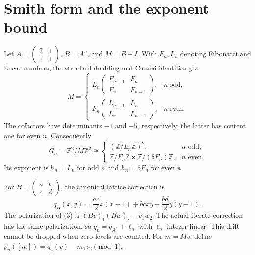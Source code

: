 \documentclass[10pt]{article}
\begin{document}
\section{Smith form and the exponent bound}
Let $A=\left(\begin{smallmatrix}2&1\\1&1\end{smallmatrix}\right)$,
$B=A^n$, and $M=B-I$.  With $F_n,L_n$ denoting Fibonacci and Lucas numbers,
the standard doubling and Cassini identities give
\[
M=\begin{cases}
L_n\left(\begin{smallmatrix}F_{n+1}&F_n\\F_n&F_{n-1}\end{smallmatrix}\right),&n\ \text{odd},\\[2pt]
F_n\left(\begin{smallmatrix}L_{n+1}&L_n\\L_n&L_{n-1}\end{smallmatrix}\right),&n\ \text{even}.
\end{cases}                                                     \tag{1}
\]
The cofactors have determinants $-1$ and $-5$, respectively; the latter has
content one for even $n$.  Consequently
\[
G_n=\mathbb Z^2/M\mathbb Z^2\cong
\begin{cases}(\mathbb Z/L_n\mathbb Z)^2,&n\text{ odd},\\
\mathbb Z/F_n\mathbb Z\times\mathbb Z/(5F_n)\mathbb Z,&n\text{ even}.
\end{cases}                                                     \tag{2}
\]
Its exponent is $h_n=L_n$ for odd $n$ and $h_n=5F_n$ for even $n$.

For $B=(\begin{smallmatrix}a&b\\c&d\end{smallmatrix})$, the canonical
lattice correction is
\[
q_B(x,y)=\frac{ac}{2}x(x-1)+bcxy+\frac{bd}{2}y(y-1).             \tag{3}
\]
The polarization of (3) is $(Bv)_1(Bw)_2-v_1w_2$.  The actual iterate
correction has the same polarization, so
$q_n=q_{A^n}+\ell_n$ with $\ell_n$ integer linear.  This drift cannot be
dropped when zero levels are counted.  For $m=Mv$, define
$\rho_n([m])=q_n(v)-m_1v_2\pmod1$.
\end{document}
